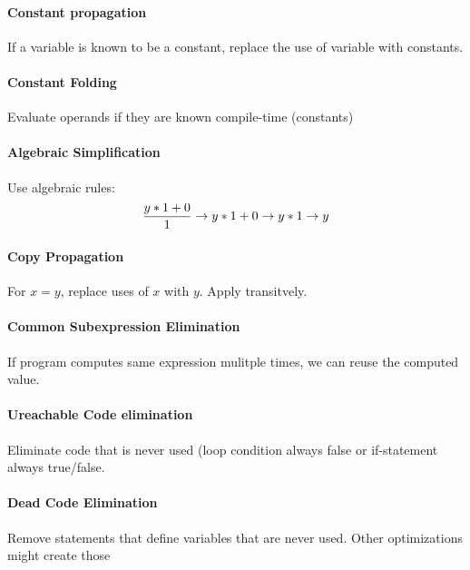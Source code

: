 \paragraph{Constant propagation} %
\label{par:Constant propagation}
If a variable is known to be a constant, replace the use of variable with constants.

\paragraph{Constant Folding} %
\label{par:Constant Folding}
Evaluate operands if they are known compile-time (constants)

\paragraph{Algebraic Simplification} %
\label{par:Algebraic Simplification}
Use algebraic rules:
\begin{equation}
	{y * 1 + 0 \over 1} \to y * 1 + 0 \to y * 1 \to y
\end{equation}

\paragraph{Copy Propagation} %
\label{par:Copy Propagation}
For $x = y$, replace uses of $x$ with $y$. Apply transitvely.

\paragraph{Common Subexpression Elimination} %
\label{par:Common Subexpression Elimination}
If program computes same expression mulitple times, we can reuse the computed value.

\paragraph{Ureachable Code elimination} %
\label{par:Ureachable Code elimination}
Eliminate code that is never used (loop condition always false or if-statement always true/false.

\paragraph{Dead Code Elimination} %
\label{par:Dead Code Elimination}
Remove statements that define variables that are never used. Other optimizations might create those

